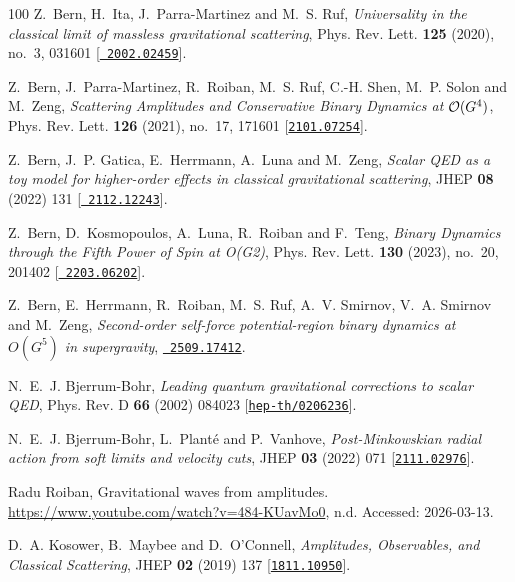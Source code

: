 \begin{thebibliography}{100}
Z.~Bern, H.~Ita, J.~Parra-Martinez and M.~S. Ruf,  {\em {Universality in the
  classical limit of massless gravitational scattering}}, Phys. Rev. Lett. {\bf
  125} (2020), no.~3, 031601 [\href{http://www.arXiv.org/abs/2002.02459}{{\tt
  2002.02459}}].

Z.~Bern, J.~Parra-Martinez, R.~Roiban, M.~S. Ruf, C.-H. Shen, M.~P. Solon and
  M.~Zeng,  {\em {Scattering Amplitudes and Conservative Binary Dynamics at
  ${\cal O}(G^4)$}}, Phys. Rev. Lett. {\bf 126} (2021), no.~17, 171601
  [\href{http://www.arXiv.org/abs/2101.07254}{{\tt 2101.07254}}].

Z.~Bern, J.~P. Gatica, E.~Herrmann, A.~Luna and M.~Zeng,  {\em {Scalar QED as a
  toy model for higher-order effects in classical gravitational scattering}},
  JHEP {\bf 08} (2022) 131 [\href{http://www.arXiv.org/abs/2112.12243}{{\tt
  2112.12243}}].

Z.~Bern, D.~Kosmopoulos, A.~Luna, R.~Roiban and F.~Teng,  {\em {Binary Dynamics
  through the Fifth Power of Spin at O(G2)}}, Phys. Rev. Lett. {\bf 130}
  (2023), no.~20, 201402 [\href{http://www.arXiv.org/abs/2203.06202}{{\tt
  2203.06202}}].

Z.~Bern, E.~Herrmann, R.~Roiban, M.~S. Ruf, A.~V. Smirnov, V.~A. Smirnov and
  M.~Zeng,  {\em {Second-order self-force potential-region binary dynamics at
  $O(G^5)$ in supergravity}}, \href{http://www.arXiv.org/abs/2509.17412}{{\tt
  2509.17412}}.

N.~E.~J. Bjerrum-Bohr,  {\em {Leading quantum gravitational corrections to
  scalar QED}}, Phys. Rev. D {\bf 66} (2002) 084023
  [\href{http://www.arXiv.org/abs/hep-th/0206236}{{\tt hep-th/0206236}}].

N.~E.~J. Bjerrum-Bohr, L.~Plant\'e and P.~Vanhove,  {\em {Post-Minkowskian
  radial action from soft limits and velocity cuts}}, JHEP {\bf 03} (2022) 071
  [\href{http://www.arXiv.org/abs/2111.02976}{{\tt 2111.02976}}].

{Radu Roiban},  Gravitational waves from amplitudes.
  \url{https://www.youtube.com/watch?v=484-KUavMo0}, n.d.
\newblock Accessed: 2026-03-13.

D.~A. Kosower, B.~Maybee and D.~O'Connell,  {\em {Amplitudes, Observables, and
  Classical Scattering}}, JHEP {\bf 02} (2019) 137
  [\href{http://www.arXiv.org/abs/1811.10950}{{\tt 1811.10950}}].


\end{thebibliography}
